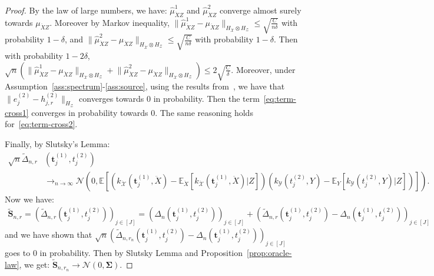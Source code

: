 \begin{proof}
By the law of large numbers, we have: $\hat{\mu}^1_{\ddot{X}Z}$ and $\hat{\mu}^2_{\ddot{X}Z}$ converge almost surely towards $\mu_{\ddot{X}Z}$. Moreover by Markov inequality, $\lVert\hat{\mu}^1_{\ddot{X}Z}-\mu_{\ddot{X}Z}\rVert_{ H_\mathcal{\ddot{X}}\otimes H_\mathcal{Z}} \leq \sqrt{\frac{C}{n\delta}}$ with probability $1-\delta$, and  $\lVert\hat{\mu}^2_{\ddot{X}Z}-\mu_{\ddot{X}Z}\rVert_{ H_\mathcal{\ddot{X}}\otimes H_\mathcal{Z}} \leq \sqrt{\frac{C}{n\delta}}$ with probability $1-\delta$. Then with probability $1-2\delta$, $\sqrt{n}\left(\lVert\hat{\mu}^1_{\ddot{X}Z}-\mu_{\ddot{X}Z}\rVert_{ H_\mathcal{\ddot{X}}\otimes H_\mathcal{Z}}+\lVert\hat{\mu}^2_{\ddot{X}Z}-\mu_{\ddot{X}Z}\rVert_{ H_\mathcal{\ddot{X}}\otimes H_\mathcal{Z}} \right)\leq2\sqrt{\frac{C}{\delta}}$. Moreover, under Assumption~\ref{ass:spectrum}-\ref{ass:source}, using the results from~\cite{fischer2020sobolev}, we have that $\lVert e^{(2)}_{j}-h^{(2)}_{j,r}\rVert_{H_\mathcal{Z}}$ converges towards $0$ in probability. Then the term~\eqref{eq:term-cross1}
converges in probability towards $0$. The same reasoning holds for~\eqref{eq:term-cross2}. 

Finally, by Slutsky's Lemma:
\begin{align*}
    \sqrt{n}\widetilde{\Delta}_{n,r}&(\mathbf{t}^{(1)}_j,t^{(2)}_j)\\
    &\to_{n\to\infty} \mathcal{N}\left(0,\mathbb{E}\left[\left(k_{\mathcal{\ddot{X}}}(\mathbf{t}^{(1)}_j,\ddot{X})-\mathbb{E}_{\ddot{X}}\left[k_{\mathcal{\ddot{X}}}(\mathbf{t}^{(1)}_j,\ddot{X})|Z\right]\right)\left(k_{\mathcal{Y}}(t^{(2)}_j,Y)-\mathbb{E}_{Y}\left[k_{\mathcal{Y}}(t^{(2)}_j,Y)|Z\right]\right)\right]\right).
\end{align*}
Now we have:
\begin{align*}
    \widetilde{\mathbf{S}}_{n,r}=\left(\widetilde{\Delta}_{n,r}(\mathbf{t}^{(1)}_j,t^{(2)}_j)\right)_{j\in[J]}=\left(\Delta_{n}(\mathbf{t}^{(1)}_j,t^{(2)}_j)\right)_{j\in[J]}+ \left(\widetilde{\Delta}_{n,r}(\mathbf{t}^{(1)}_j,t^{(2)}_j)-\Delta_{n}(\mathbf{t}^{(1)}_j,t^{(2)}_j)\right)_{j\in[J]}
\end{align*}
 and  we have shown that $\sqrt{n}\left(\widetilde{\Delta}_{n,r_n}(\mathbf{t}^{(1)}_j,t^{(2)}_j)-\Delta_{n}(\mathbf{t}^{(1)}_j,t^{(2)}_j)\right)_{j\in[J]}$ goes to $0$ in probability. Then by Slutsky Lemma and Proposition~\ref{prop:oracle-law}, we get: $\widetilde{\mathbf{S}}_{n,r_n}\to\mathcal{N}\left(0,\bm{\Sigma}\right)$.%


\end{proof}
